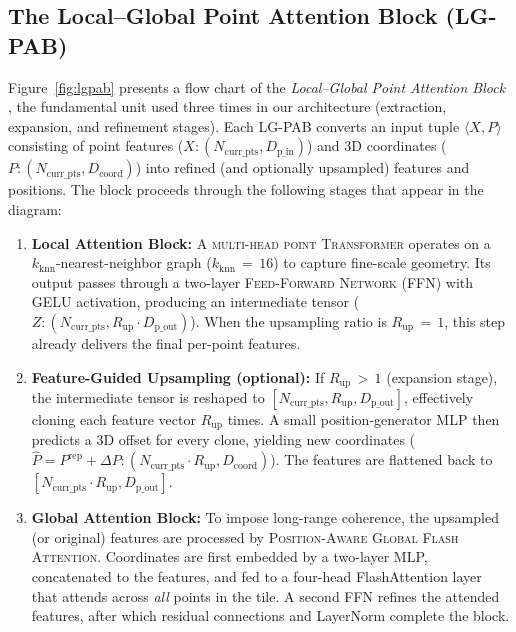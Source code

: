 \documentclass[remotesensing,article,accept,pdftex,moreauthors]{Definitions/mdpi}
\begin{document}
\subsection{The Local–Global Point Attention Block (LG-PAB)}
\label{sec:lgpab}



Figure~\ref{fig:lgpab} presents a flow chart of the \emph{Local–Global Point Attention Block
}, the fundamental unit used three times in our architecture (extraction, expansion, and refinement stages). Each LG-PAB converts an input tuple $\langle X, P \rangle$ consisting of point features ($X: (N_{\text{curr\_pts}}, D_{\text{p\_in}})$) and 3D coordinates ($P: (N_{\text{curr\_pts}}, D_{\text{coord}})$) into refined (and optionally upsampled) features and positions. The block proceeds through the following stages that appear in the diagram:

\begin{enumerate}[leftmargin=*]
\item \textbf{Local Attention Block:}
      A
      \textsc{multi-head point Transformer} operates on a $k_{\text{knn}}$-nearest-neighbor graph ($k_{\text{knn}}\,{=}\,16$) to capture fine-scale geometry. Its output passes through a two-layer \textsc{Feed-Forward Network} (FFN) with GELU activation, producing an intermediate tensor
      ($Z: (N_{\text{curr\_pts}}, R_{\text{up}} \cdot D_{\text{p\_out}})$). When the upsampling ratio is $R_{\text{up}}\,{=}\,1$, this step already delivers the final per-point features.

\item[\emph{2\,a}] \textbf{Feature-Guided Upsampling (optional):
}
      If $R_{\text{up}}\,{>}\,1$ (expansion stage), the intermediate tensor is reshaped to $[N_{\text{curr\_pts}}, R_{\text{up}}, D_{\text{p\_out}}]$, effectively cloning each feature vector $R_{\text{up}}$ times.
      A small position-generator MLP then predicts a 3D offset for every clone, yielding new coordinates
      ($\hat{P} = P^{\text{rep}} + \Delta P: (N_{\text{curr\_pts}} \cdot R_{\text{up}}, D_{\text{coord}})$).
      The features are flattened back to $[N_{\text{curr\_pts}} \cdot R_{\text{up}}, D_{\text{p\_out}}]$.

\item \textbf{Global Attention Block:}
      To impose long-range coherence, the upsampled (or original) features are processed by
      \textsc{Position-Aware Global Flash Attention}. Coordinates are first embedded by a two-layer MLP, concatenated to the features, and fed to a four-head FlashAttention layer that attends across \emph{all} points in the tile. A second FFN refines the attended features, after which residual connections and LayerNorm complete the block.
\end{enumerate}
\end{document}
